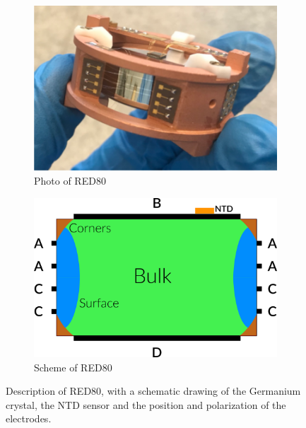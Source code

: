 \begin{figure}
\centering
\begin{subfigure}{.5\textwidth}
  \centering
  \includegraphics[width=\linewidth]{Figures/Neutron/photo_red80.png}
  \caption{Photo of RED80}
  \label{fig:photo-red80}
\end{subfigure}%
\begin{subfigure}{0.5\textwidth}
  \centering
  \includegraphics[width=\linewidth]{Figures/Neutron/scheme_red80.png}
  \caption{Scheme of RED80}
  \label{fig:scheme-red80}
\end{subfigure}
\caption{Description of RED80, with a schematic drawing of the Germanium crystal, the NTD sensor and the position and polarization of the electrodes.}
\label{fig:description-red80}
\end{figure}

